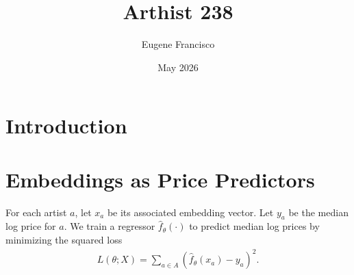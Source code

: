 \documentclass[12pt]{article}
\title{Arthist 238}
\author{Eugene Francisco}
\date{May 2026}
\begin{document}
\begin{singlespace}
	\maketitle
\end{singlespace}

\section*{Introduction}
\section*{Embeddings as Price Predictors}
For each artist $a$, let $x_a$ be its associated embedding vector. Let $y_a$ be the median log price for $a$. We train a regressor $\hat f_\theta(\cdot)$ to predict median log prices by minimizing the squared loss
\begin{align*}
	L(\theta; X) = \sum_{a\in A}\left(\hat f_\theta(x_a) - y_a\right)^2.
\end{align*}
\end{document}
